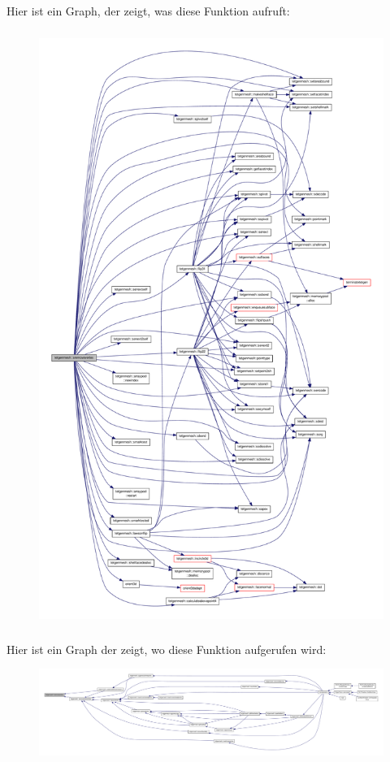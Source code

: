 Hier ist ein Graph, der zeigt, was diese Funktion aufruft\-:
\nopagebreak
\begin{figure}[H]
\begin{center}
\leavevmode
\includegraphics[height=550pt]{classtetgenmesh_a7fc2b1bb2e54a5e013edc3e23bd0523b_cgraph}
\end{center}
\end{figure}




Hier ist ein Graph der zeigt, wo diese Funktion aufgerufen wird\-:
\nopagebreak
\begin{figure}[H]
\begin{center}
\leavevmode
\includegraphics[width=350pt]{classtetgenmesh_a7fc2b1bb2e54a5e013edc3e23bd0523b_icgraph}
\end{center}
\end{figure}


